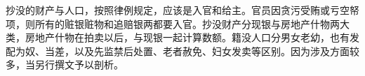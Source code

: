 抄没的财产与人口，按照律例规定，应该是入官和给主。官员因贪污受贿或亏空帑项，则所有的赃银赃物和追赔银两都要入官。抄没财产分现银与房地产什物两大类，房地产什物在拍卖以后，与现银一起计算数额。籍没人口分男女老幼，也有发配为奴、当差，以及先监禁后处置、老者赦免、妇女发卖等区别。因为涉及方面较多，当另行撰文予以剖析。

\vfill
\begin{BookNotes}
\end{BookNotes}
